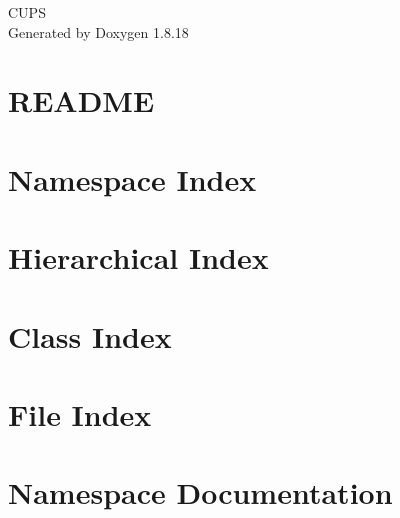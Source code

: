 \let\mypdfximage\pdfximage\def\pdfximage{\immediate\mypdfximage}\documentclass[twoside]{book}
\newcommand{\+}{\discretionary{\mbox{\scriptsize$\hookleftarrow$}}{}{}}
\newcommand{\clearemptydoublepage}{%
  \newpage{\pagestyle{empty}\cleardoublepage}%
}
\begin{document}
\hypersetup{pageanchor=false,
             bookmarksnumbered=true,
             pdfencoding=unicode
            }
\begin{titlepage}
\vspace*{7cm}
\begin{center}%
{\Large C\+U\+PS }\\
\vspace*{1cm}
{\large Generated by Doxygen 1.8.18}\\
\end{center}
\end{titlepage}
\clearemptydoublepage
{}
\tableofcontents
\clearemptydoublepage
{}
\hypersetup{pageanchor=true}

\chapter{R\+E\+A\+D\+ME}
\label{md__c_1__users_dorai__desktop__def_can_plus_ultra__r_e_a_d_m_e}

\chapter{Namespace Index}

\chapter{Hierarchical Index}

\chapter{Class Index}

\chapter{File Index}

\chapter{Namespace Documentation}














\end{document}

